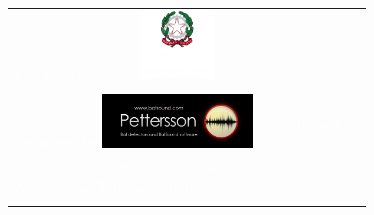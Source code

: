 \documentclass[final,italian]{memoir}
\begin{document}
\vfill
\begin{tabularx}{180mm}{p{42mm}Xp{}}
  \selectfont\textcolor{white}{\tiny Con il patrocinio di}\newline
  \includegraphics[width=20mm]{ISPRA CENTRATO bianco.png} &
  &
  \\
  && \\
  
    \selectfont\textcolor{white}{\tiny Sponsored by}\newline
    \includegraphics[width=40mm]{Logo_Pettersson_h_ed2_www2_20.png} &
    &
    \flushright
    {\noindent\sffamily\large\textcolor{white}{published by}}\\
    {\noindent\sffamily\Large\textcolor{white}{Gruppo Italiano Ricerca Chirotteri\\Associazione Teriologica Italiana}} \\
  \e
  
  
\end{tabularx}
\clearpage

\hysfrontendpaper

\clearpage


\hysheader
\hysfooter
\clearpage

\end{document}
